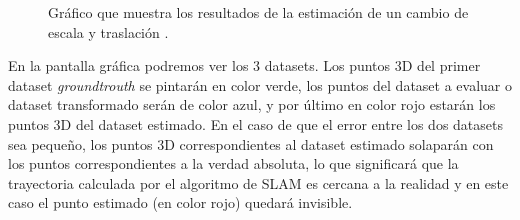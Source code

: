 \begin{figure}[H]
\begin{center}
\hspace{0.5cm}

\end{center}

\caption{Gráfico que muestra los resultados de la estimación de un cambio de escala y traslación .}
\end{figure}

En la pantalla gráfica podremos ver los 3 datasets. Los puntos 3D del primer dataset \textit{groundtrouth} se pintarán en color verde, los puntos del dataset a evaluar o dataset transformado serán de color azul, y por último en color rojo estarán los puntos 3D del dataset estimado.
En el caso de que el error entre los dos datasets sea pequeño, los puntos 3D correspondientes al dataset estimado solaparán con los puntos correspondientes a la verdad absoluta, lo que significará que la trayectoria calculada por el algoritmo de SLAM es cercana a la realidad y en este caso el punto estimado (en color rojo) quedará invisible. 



